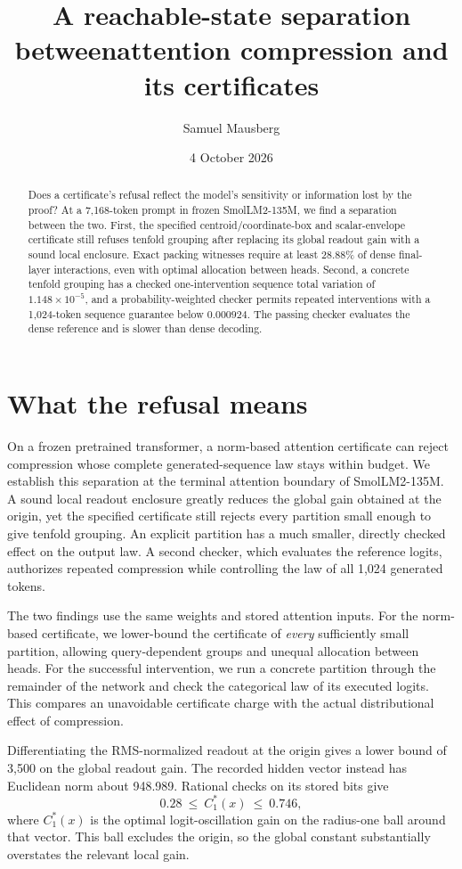 \documentclass[10pt]{article}
\title{A reachable-state separation between\newline attention compression and its certificates}
\author{Samuel Mausberg}
\date{4 October 2026}
\theoremstyle{definition}\newtheorem{definition}[theorem]{Definition}
\begin{document}
\maketitle
\begin{abstract}
Does a certificate's refusal reflect the model's sensitivity or information lost by the proof? At a 7,168-token prompt in frozen SmolLM2-135M, we find a separation between the two. First, the specified centroid/coordinate-box and scalar-envelope certificate still refuses tenfold grouping after replacing its global readout gain with a sound local enclosure. Exact packing witnesses require at least 28.88\% of dense final-layer interactions, even with optimal allocation between heads. Second, a concrete tenfold grouping has a checked one-intervention sequence total variation of $1.148\times10^{-5}$, and a probability-weighted checker permits repeated interventions with a 1,024-token sequence guarantee below $0.000924$. The passing checker evaluates the dense reference and is slower than dense decoding.
\end{abstract}

\section{What the refusal means}
On a frozen pretrained transformer, a norm-based attention certificate can reject compression whose complete generated-sequence law stays within budget. We establish this separation at the terminal attention boundary of SmolLM2-135M. A sound local readout enclosure greatly reduces the global gain obtained at the origin, yet the specified certificate still rejects every partition small enough to give tenfold grouping. An explicit partition has a much smaller, directly checked effect on the output law. A second checker, which evaluates the reference logits, authorizes repeated compression while controlling the law of all 1,024 generated tokens.

The two findings use the same weights and stored attention inputs. For the norm-based certificate, we lower-bound the certificate of \emph{every} sufficiently small partition, allowing query-dependent groups and unequal allocation between heads. For the successful intervention, we run a concrete partition through the remainder of the network and check the categorical law of its executed logits. This compares an unavoidable certificate charge with the actual distributional effect of compression.

Differentiating the RMS-normalized readout at the origin gives a lower bound of 3,500 on the global readout gain. The recorded hidden vector instead has Euclidean norm about 948.989. Rational checks on its stored bits give
\begin{equation}\label{eq:localintro}
             0.28\ \leq\ C_1^*(x)\ \leq\ 0.746,
\end{equation}
where $C_1^*(x)$ is the optimal logit-oscillation gain on the radius-one ball around that vector. This ball excludes the origin, so the global constant substantially overstates the relevant local gain.
\end{document}
